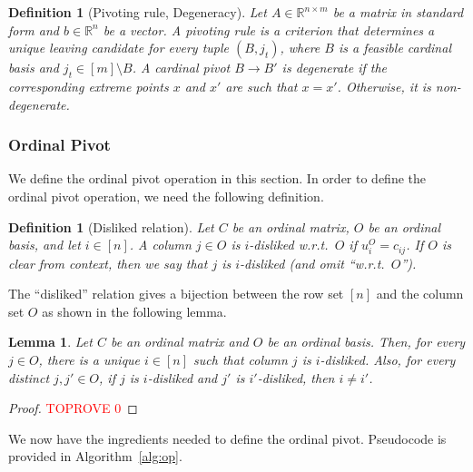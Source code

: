 \documentclass[11pt]{article}
\newcommand{\R}{\mathbb{R}}
\newtheorem{lemma}[theorem]{Lemma}
\newtheorem{definition}[theorem]{Definition}
\begin{document}
\begin{definition}[Pivoting rule, Degeneracy]\label{def:degenerate}
Let $A\in \R^{n\times m}$ be a matrix in standard form and $b\in \R^n$ be a vector. 
A \emph{pivoting rule} is a criterion that determines a unique leaving candidate for every tuple $(B, j_t)$, where $B$ is a feasible cardinal basis and $j_t\in [m]\setminus B$.
A cardinal pivot $B\to B'$ is \emph{degenerate} if the corresponding extreme points $x$ and $x'$ are such that $x=x'$. Otherwise, it is \emph{non-degenerate}.
\end{definition}









\subsubsection{Ordinal Pivot}\label{sec:pre-op}
We define the ordinal pivot operation in this section. In order to define the ordinal pivot operation, we need the following definition. 

\begin{definition}[Disliked relation]
    Let $C$ be an ordinal matrix, $O$ be an ordinal basis, and let $i\in[n]$. A column $j\in O$ is \emph{$i$-disliked} w.r.t.~$O$ if $u_i^O=c_{ij}$. If $O$ is clear from context, then we say that $j$ is $i$-disliked (and omit ``w.r.t.~$O$'').
\end{definition}

The ``disliked'' relation gives a bijection between the row set $[n]$ and the column set $O$ as shown in the following lemma.
\begin{lemma}\label{lem:disliked-oneone}
    Let $C$ be an ordinal matrix and $O$ be an ordinal basis. Then, for every $j\in O$, there is a unique $i\in[n]$ such that column $j$ is $i$-disliked. Also, for every distinct $j,j'\in O$, if $j$ is $i$-disliked and $j'$ is $i'$-disliked, then $i\neq i'$.
\end{lemma}

\begin{proof}\textcolor{red}{TOPROVE 0}\end{proof}

We now have the ingredients needed to define the ordinal pivot. Pseudocode is provided in Algorithm~\ref{alg:op}.
\end{document}
